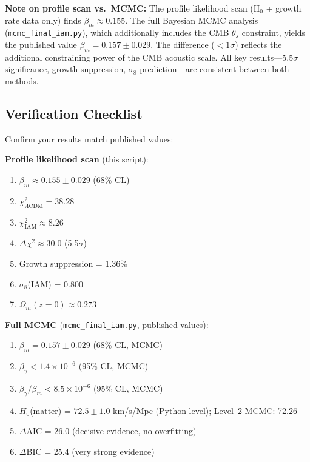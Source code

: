 \documentclass[11pt]{article}
\begin{document}
\noindent\textbf{Note on profile scan vs.\ MCMC:} The profile likelihood scan (H$_0$ + growth rate data only) finds $\beta_m \approx 0.155$. The full Bayesian MCMC analysis (\texttt{mcmc\_final\_iam.py}), which additionally includes the CMB $\theta_s$ constraint, yields the published value $\beta_m = 0.157 \pm 0.029$. The difference ($<1\sigma$) reflects the additional constraining power of the CMB acoustic scale. All key results---5.5$\sigma$ significance, growth suppression, $\sigma_8$ prediction---are consistent between both methods.

\subsection{Verification Checklist}

Confirm your results match published values:

\noindent\textbf{Profile likelihood scan} (this script):
\begin{enumerate}
    \item[$\square$] $\beta_m \approx 0.155 \pm 0.029$ (68\% CL)
    \item[$\square$] $\chi^2_{\Lambda\text{CDM}} = 38.28$
    \item[$\square$] $\chi^2_{\text{IAM}} \approx 8.26$
    \item[$\square$] $\Delta\chi^2 \approx 30.0$ (5.5$\sigma$)
    \item[$\square$] Growth suppression = 1.36\%
    \item[$\square$] $\sigma_8$(IAM) = 0.800
    \item[$\square$] $\Omega_m(z=0) \approx 0.273$
\end{enumerate}

\noindent\textbf{Full MCMC} (\texttt{mcmc\_final\_iam.py}, published values):
\begin{enumerate}
    \item[$\square$] $\beta_m = 0.157 \pm 0.029$ (68\% CL, MCMC)
    \item[$\square$] $\beta_\gamma < 1.4 \times 10^{-6}$ (95\% CL, MCMC)
    \item[$\square$] $\beta_\gamma/\beta_m < 8.5 \times 10^{-6}$ (95\% CL, MCMC)
    \item[$\square$] $H_0$(matter) = $72.5 \pm 1.0$ km/s/Mpc (Python-level); Level~2 MCMC: 72.26
    \item[$\square$] $\Delta$AIC = 26.0 (decisive evidence, no overfitting)
    \item[$\square$] $\Delta$BIC = 25.4 (very strong evidence)
\end{enumerate}
\end{document}
